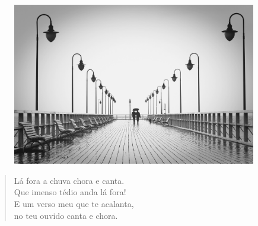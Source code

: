 \begin{myquote}



\begin{figure}[H]
\centering
\includegraphics[width=0.95\textwidth]{./imgSAEB_7_POR/media/image73.png}
\end{figure} 

\begin{verse}

Lá fora a chuva chora e canta. \\
Que imenso tédio anda lá fora! \\
E um verso meu que te acalanta, \\
no teu ouvido canta e chora.


\end{verse}

\end{myquote}

